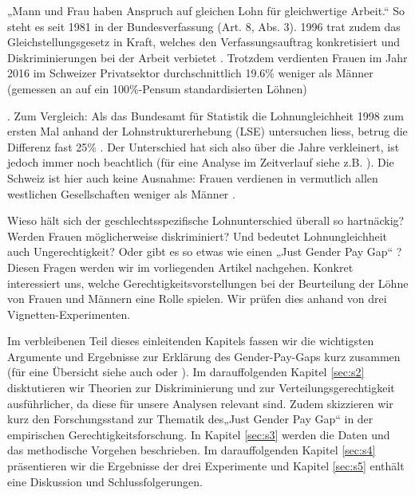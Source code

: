 \documentclass[a4paper,12pt]{article}
\renewcommand{\baselinestretch}{1.1}
\newif\ifcomments
\newcommand{\comment}[1]{%
    \ifcomments\marginpar{\renewcommand{\baselinestretch}{1}\tiny\hspace*{-1.1em}\colorbox{gray!20}%
    {\textcolor{red}{\parbox[t]{.9in}{\raggedright #1}}}}\fi}
\begin{document}
\comment{Hinweis auf Heiratsrecht bis 1988: “Note that this arrangement was enshrined 
in Switzerland’s marriage law until 1988, giving husbands the status as legal 
head of family from whom wives needed the consent in order to take on paid employment.” 
(Paper von Benita und Oli Oesch im ESR; das paper sollte irgendwo zitiert werden)}

\comment{cite „Oesch:2017“ somewhere; see bibtex file}

\comment{OK, beide Artikel zitiert.}

 „Mann und Frau haben Anspruch auf gleichen Lohn für gleichwertige Arbeit.“ So steht es seit 1981 in der Bundesverfassung (Art. 8, Abs. 3). 1996 trat zudem das Gleichstellungsgesetz in Kraft, welches den Verfassungsauftrag konkretisiert und Diskriminierungen bei der Arbeit verbietet  \citep{EDI-2019}. Trotzdem verdienten Frauen im Jahr 2016 im Schweizer Privatsektor durchschnittlich 19.6\% weniger als Männer
(gemessen an auf ein 100\%-Pensum standardisierten Löhnen) \comment{Zahlen aktualisieren? -> Zahlen aktualisiert.}
\citep{BFS-2019a}. Zum Vergleich: Als das Bundesamt für Statistik die
Lohnungleichheit 1998 zum ersten Mal anhand der Lohnstrukturerhebung (LSE)
untersuchen liess, betrug die Differenz fast 25\% \citep{Strub-etal-2006}. Der
Unterschied hat sich also über die Jahre verkleinert, ist jedoch immer noch
beachtlich (für eine Analyse im Zeitverlauf siehe z.B. \citealp{Schmid-2016}). Die Schweiz ist hier auch keine Ausnahme: Frauen verdienen in vermutlich allen westlichen Gesellschaften weniger als Männer \citep{Blau-2016}.

Wieso hält sich der geschlechtsspezifische Lohnunterschied überall so hartnäckig? Werden Frauen möglicherweise diskriminiert? Und bedeutet Lohnungleichheit auch Ungerechtigkeit? Oder gibt es so etwas wie einen „Just Gender Pay Gap“ \citep{Jasso-Webster-1997,Sauer-2014}? Diesen Fragen werden wir im vorliegenden Artikel nachgehen. Konkret interessiert uns, welche Gerechtigkeitsvorstellungen bei der Beurteilung der Löhne von Frauen und Männern eine Rolle spielen. Wir prüfen dies anhand von drei Vignetten-Experimenten.
\comment{noch konkreter?}
Im verbleibenen Teil dieses einleitenden Kapitels fassen wir die wichtigsten Argumente und Ergebnisse zur Erklärung des Gender-Pay-Gaps kurz zusammen (für eine Übersicht siehe auch \citealp{Blau-Kahn-2017} oder \citealp{Weichselbaumer-Winter-Ebmer-2005}). Im darauffolgenden Kapitel \ref{sec:s2} disktutieren wir Theorien zur Diskriminierung und zur Verteilungsgerechtigkeit ausführlicher, da diese für unsere Analysen relevant sind. Zudem skizzieren wir kurz den Forschungsstand zur Thematik des„Just Gender Pay Gap“ in der empirischen Gerechtigkeitsforschung. In Kapitel \ref{sec:s3} werden die Daten und das methodische Vorgehen beschrieben. Im darauffolgenden Kapitel \ref{sec:s4} präsentieren wir die Ergebnisse der drei Experimente und Kapitel \ref{sec:s5} enthält eine Diskussion und Schlussfolgerungen.
\end{document}
